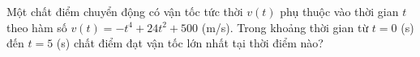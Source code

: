 \begin{vd}%
	Một chất điểm chuyển động có vận tốc tức thời $v(t)$ phụ thuộc vào thời gian $t$ theo hàm số $v(t)=-t^4+24t^2+500$ (m/s). Trong khoảng thời gian từ $t=0$ (s) đến $t=5$ (s) chất điểm đạt vận tốc lớn nhất tại thời điểm nào?
\end{vd}

